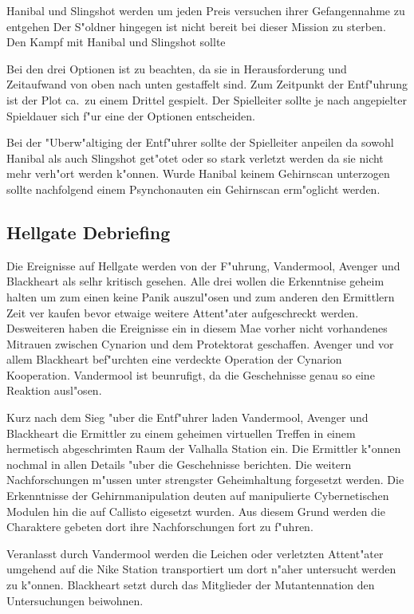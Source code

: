 Hanibal und Slingshot werden um jeden Preis versuchen ihrer Gefangennahme zu entgehen Der S"oldner hingegen ist nicht bereit bei dieser Mission zu sterben. Den Kampf mit Hanibal und Slingshot sollte

\begin{remarks}
	Bei den drei Optionen ist zu beachten, da\3 sie in Herausforderung und Zeitaufwand von oben nach unten gestaffelt sind. Zum Zeitpunkt der Entf"uhrung ist der Plot ca.~zu einem Drittel gespielt. Der Spielleiter sollte je nach angepielter Spieldauer sich f"ur eine der Optionen entscheiden.

	Bei der "Uberw"altiging der Entf"uhrer sollte der Spielleiter anpeilen da\3 sowohl Hanibal als auch Slingshot get"otet oder so stark verletzt werden da\3 sie nicht mehr verh"ort werden k"onnen. Wurde Hanibal keinem Gehirnscan unterzogen sollte nachfolgend einem Psynchonauten ein Gehirnscan erm"oglicht werden.
\end{remarks}


\subsection{Hellgate Debriefing}

Die Ereignisse auf Hellgate werden von der F"uhrung, Vandermool, Avenger und Blackheart als selhr kritisch gesehen. Alle drei wollen die Erkenntnise geheim halten um zum einen keine Panik auszul"osen und zum anderen den Ermittlern Zeit ver kaufen bevor etwaige weitere Attent"ater aufgeschreckt werden. Desweiteren haben die Ereignisse ein in diesem Ma\3e vorher nicht vorhandenes Mi\3trauen zwischen Cynarion und dem Protektorat geschaffen. Avenger und vor allem Blackheart bef"urchten eine verdeckte Operation der Cynarion Kooperation. Vandermool ist beunrufigt, da\3 die Geschehnisse genau so eine Reaktion ausl"osen.

Kurz nach dem Sieg "uber die Entf"uhrer laden Vandermool, Avenger und Blackheart die Ermittler zu einem geheimen virtuellen Treffen in einem hermetisch abgeschrimten Raum der Valhalla Station ein. Die Ermittler k"onnen nochmal in allen Details "uber die Geschehnisse berichten. Die weitern Nachforschungen m"ussen unter strengster Geheimhaltung forgesetzt werden. Die Erkenntnisse der Gehirnmanipulation deuten auf manipulierte Cybernetischen Modulen hin die auf Callisto eigesetzt wurden. Aus diesem Grund werden die Charaktere gebeten dort ihre Nachforschungen fort zu f"uhren.

Veranlasst durch Vandermool werden die Leichen oder verletzten Attent"ater umgehend auf die Nike Station transportiert um dort n"aher untersucht werden zu k"onnen. Blackheart setzt durch das Mitglieder der Mutantennation den Untersuchungen beiwohnen.

